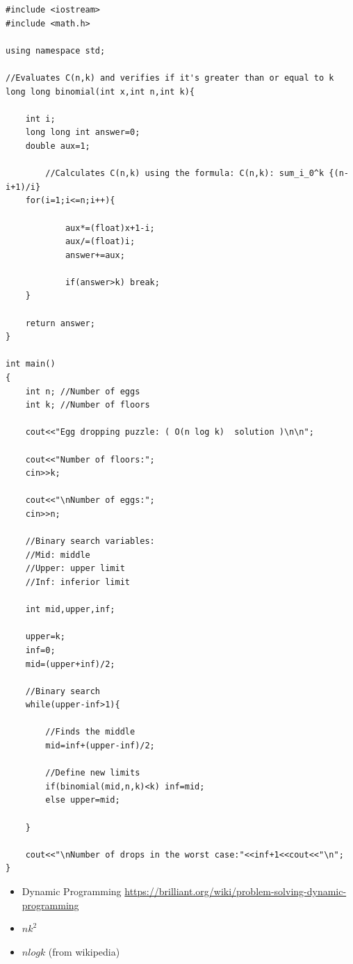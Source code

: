 \begin{lstlisting}[style=raycppnewsnippet]
#include <iostream>
#include <math.h>

using namespace std;

//Evaluates C(n,k) and verifies if it's greater than or equal to k
long long binomial(int x,int n,int k){

    int i;
    long long int answer=0;
    double aux=1;

        //Calculates C(n,k) using the formula: C(n,k): sum_i_0^k {(n-i+1)/i}
    for(i=1;i<=n;i++){

            aux*=(float)x+1-i;
            aux/=(float)i;
            answer+=aux;

            if(answer>k) break;
    }

    return answer;
}

int main()
{
    int n; //Number of eggs
    int k; //Number of floors

    cout<<"Egg dropping puzzle: ( O(n log k)  solution )\n\n";

    cout<<"Number of floors:";
    cin>>k;

    cout<<"\nNumber of eggs:";
    cin>>n;

    //Binary search variables:
    //Mid: middle
    //Upper: upper limit
    //Inf: inferior limit

    int mid,upper,inf;

    upper=k;
    inf=0;
    mid=(upper+inf)/2;

    //Binary search
    while(upper-inf>1){

        //Finds the middle
        mid=inf+(upper-inf)/2;

        //Define new limits
        if(binomial(mid,n,k)<k) inf=mid;
        else upper=mid;

    }

    cout<<"\nNumber of drops in the worst case:"<<inf+1<<cout<<"\n";
}
\end{lstlisting}



\begin{itemize}%
\item Dynamic Programming \url{https://brilliant.org/wiki/problem-solving-dynamic-programming}
\end{itemize}


\begin{itemize}%
\item $nk^2$
\item $n log k$ (from wikipedia)
\end{itemize}

